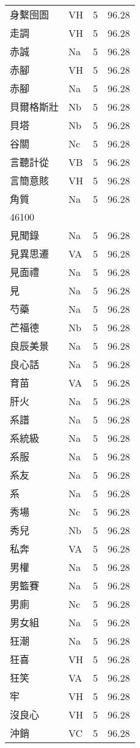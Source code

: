 \documentclass[twocolumn]{book}
\begin{document}
\begin{supertabular}{llrr}
身繫囹圄 & VH & 5 &  96.28\\
走調 & VH & 5 &  96.28\\
赤誠 & Na & 5 &  96.28\\
赤腳 & VH & 5 &  96.28\\
赤腳 & Na & 5 &  96.28\\
貝爾格斯壯 & Nb & 5 &  96.28\\
貝塔 & Nb & 5 &  96.28\\
谷關 & Nc & 5 &  96.28\\
言聽計從 & VB & 5 &  96.28\\
言簡意賅 & VH & 5 &  96.28\\
角質 & Na & 5 &  96.28\\
46100\\
見聞錄 & Na & 5 &  96.28\\
見異思遷 & VA & 5 &  96.28\\
見面禮 & Na & 5 &  96.28\\
見 & Na & 5 &  96.28\\
芍藥 & Na & 5 &  96.28\\
芒福德 & Nb & 5 &  96.28\\
良辰美景 & Na & 5 &  96.28\\
良心話 & Na & 5 &  96.28\\
育苗 & VA & 5 &  96.28\\
肝火 & Na & 5 &  96.28\\
系譜 & Na & 5 &  96.28\\
系統級 & Na & 5 &  96.28\\
系服 & Na & 5 &  96.28\\
系友 & Na & 5 &  96.28\\
系 & Na & 5 &  96.28\\
秀場 & Nc & 5 &  96.28\\
秀兒 & Nb & 5 &  96.28\\
私奔 & VA & 5 &  96.28\\
男權 & Na & 5 &  96.28\\
男籃賽 & Na & 5 &  96.28\\
男廁 & Nc & 5 &  96.28\\
男女組 & Na & 5 &  96.28\\
狂潮 & Na & 5 &  96.28\\
狂喜 & VH & 5 &  96.28\\
狂笑 & VA & 5 &  96.28\\
牢 & VH & 5 &  96.28\\
沒良心 & VH & 5 &  96.28\\
沖銷 & VC & 5 &  96.28\\

\end{supertabular}
\end{document}
